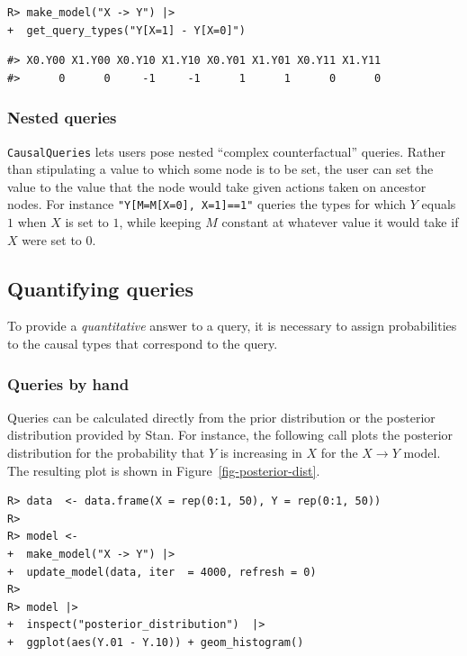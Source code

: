 \documentclass[
  11pt,
  article]{jss}
\begin{document}
\begin{verbatim}
R> make_model("X -> Y") |> 
+  get_query_types("Y[X=1] - Y[X=0]")
\end{verbatim}

\begin{verbatim}
#> X0.Y00 X1.Y00 X0.Y10 X1.Y10 X0.Y01 X1.Y01 X0.Y11 X1.Y11 
#>      0      0     -1     -1      1      1      0      0
\end{verbatim}

\subsubsection{Nested queries}\label{nested-queries}

\texttt{CausalQueries} lets users pose nested ``complex counterfactual''
queries. Rather than stipulating a value to which some node is to be
set, the user can set the value to the value that the node would take
given actions taken on ancestor nodes. For instance
\texttt{"Y{[}M=M{[}X=0{]},\ X=1{]}==1"} queries the types for which
\(Y\) equals \(1\) when \(X\) is set to \(1\), while keeping \(M\)
constant at whatever value it would take if \(X\) were set to \(0\).

\subsection{Quantifying queries}\label{quantifying-queries}

To provide a \emph{quantitative} answer to a query, it is necessary to
assign probabilities to the causal types that correspond to the query.

\subsubsection{Queries by hand}\label{queries-by-hand}

Queries can be calculated directly from the prior distribution or the
posterior distribution provided by Stan. For instance, the following
call plots the posterior distribution for the probability that \(Y\) is
increasing in \(X\) for the \(X \rightarrow Y\) model. The resulting
plot is shown in Figure~\ref{fig-posterior-dist}.

\begin{verbatim}
R> data  <- data.frame(X = rep(0:1, 50), Y = rep(0:1, 50))
R> 
R> model <- 
+  make_model("X -> Y") |>
+  update_model(data, iter  = 4000, refresh = 0)
R> 
R> model |> 
+  inspect("posterior_distribution")  |> 
+  ggplot(aes(Y.01 - Y.10)) + geom_histogram() 
\end{verbatim}
\end{document}
